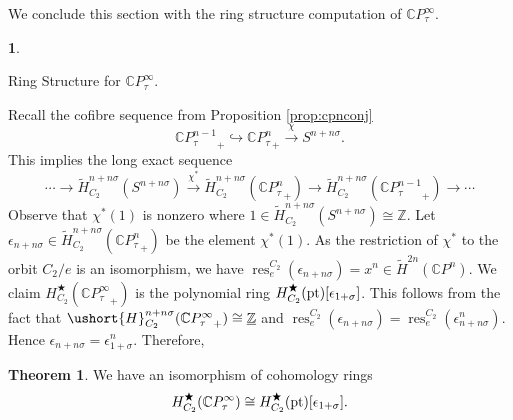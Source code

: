 \documentclass[a4paper,leqno,11pt]{amsart}
\theoremstyle{plain}
\theoremstyle{definition}
\newtheorem{subsec}[theorem]{}
\newtheorem{thm}[theorem]{Theorem}
\theoremstyle{remark}
\theoremstyle{definition}
\newcommand{\C}{{\mathbb C}}
\newcommand{\Z}{{\mathbb{Z}}}
\newenvironment{mysubsection}[2][]
{\begin{subsec}\begin{upshape}\begin{bfseries}{#2.}
			\end{bfseries}{#1}}
		{\end{upshape}\end{subsec}}
\newcommand{\res}{\mathit{res}}
\newcommand{\uH}{\ushort{H}}
\newcommand{\uZ}{\underline{\mathbb{Z}}}
\def\Z{\mathbb{Z}}
\def\C{\mathbb{C}}
\numberwithin{equation}{section}
\def\tH{\tilde{H}}
\newcommand{\pt}{\textup{pt}}
\renewcommand{\res}{\operatorname{res}}
\begin{document}
	We conclude this section with the ring structure computation of ${\C P^\infty_\tau}$.
	\begin{mysubsection}{Ring Structure for ${\C P^\infty_\tau}$} Recall  the cofibre sequence from Proposition  \ref{prop:cpnconj} 
		\[
		{	\C P^{n-1}_\tau}_+\hookrightarrow  {\C P^n_\tau}_+\xrightarrow{\chi} S^{n+n\sigma}.
		\]
		This implies the long exact sequence 
		\[
		\cdots \to \tH_{C_2}^{n+n\sigma}(S^{n+n\sigma})\xrightarrow{\chi^*} \tH_{C_2}^{n+n\sigma}({\C P^n_\tau}_+)\to  \tH_{C_2}^{n+n\sigma}({\C P^{n-1}_\tau}_+)\to \cdots
		\]
		Observe  that $ \chi^*(1) $ is nonzero where $ 1\in \tH_{C_2}^{n+n\sigma}(S^{n+n\sigma})\cong \Z $. Let $ \epsilon_{n+n\sigma}\in \tH_{C_2}^{n+n\sigma}({\C P^n_\tau}_+) $ be the element $ \chi^*(1) $.  As the restriction of $ \chi^* $ to the orbit $ C_2/e $ is an  isomorphism, we have $ \res^{C_2}_e(\epsilon_{n+n\sigma})=x^n \in \tH^{2n}(\C P^n)$. We claim $ H^\bigstar_{C_2}({\C P^\infty_\tau}_+)$ is  the polynomial ring  $H^\bigstar_{C_2}(\pt)[\epsilon_{1+\sigma}] $. This follows from the fact that $ \uH^{n+n\sigma}_{C_2}({\C P^\infty_\tau}_+)\cong \uZ $ and $ \res^{C_2}_e(\epsilon_{n+n\sigma})=\res^{C_2}_e(\epsilon^n_{n+n\sigma}) $. Hence $ \epsilon_{n+n\sigma}=\epsilon^n_{1+\sigma} $. Therefore, 
		\begin{thm}\label{cptau2}
		We have an isomorphism of cohomology rings
		\[H^\bigstar_{C_2}(\C P^\infty_\tau)\cong H^\bigstar_{C_2}(\pt)[\epsilon_{1+\sigma}].\]
		\end{thm}
	\end{mysubsection}
\end{document}
